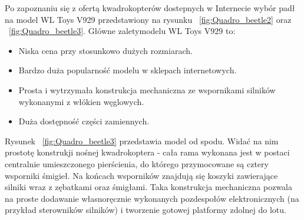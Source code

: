 Po zapoznaniu się z ofertą kwadrokopterów dostepnych w Internecie wybór padł na model WL Toys V929 przedstawiony na rysunku ~\ref{fig:Quadro_beetle2} oraz ~\ref{fig:Quadro_beetle3}. Główne zaletymodelu WL Toys V929 to:

\begin{itemize}
	\item Niska cena przy stosunkowo dużych rozmiarach.
	\item Bardzo duża popularność modelu w sklepach internetowych.
	\item Prosta i wytrzymała konstrukcja mechaniczna ze wspornikami silników wykonanymi z włókien węglowych.
	\item Duża dostępność części zamiennych.
\end{itemize}



Rysunek ~\ref{fig:Quadro_beetle3} przedstawia model od spodu. Widać na nim prostotę konstrukji nośnej kwadrokoptera - cała rama wykonana jest w postaci centralnie umieszczonego pierścienia, do którego przymocowane są cztery wsporniki śmigieł. Na końcach wsporników znajdują się koszyki zawierające silniki wraz z zębatkami oraz śmigłami. Taka konstrukcja mechaniczna pozwala na proste dodawanie własnoręcznie wykonanych pozdespołów elektronicznych (na przykład sterowników silników) i tworzenie gotowej platformy zdolnej do lotu. 

